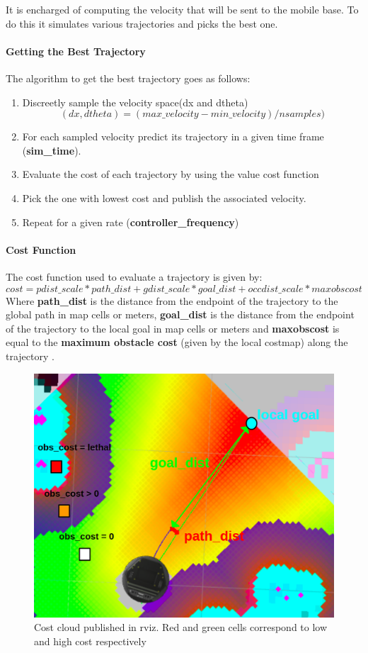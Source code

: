 \documentclass[12pt]{article}
\begin{document}
It is encharged of computing the velocity that will be sent to the mobile base. To do this it simulates various trajectories and picks the best one.

\paragraph{Getting the Best Trajectory}

The algorithm to get the best trajectory goes as follows:
\begin{enumerate}
    \item Discreetly sample the velocity space(dx and dtheta)
    \[(dx,dtheta)=(max\_velocity-min\_velocity)/nsamples)\]
    \item For each sampled velocity predict its trajectory in a given time frame (\textbf{sim\_time}).
    \item Evaluate the cost of each trajectory  by using the value cost function
    \item Pick the one with lowest cost and publish the associated velocity.
    \item Repeat for a given rate (\textbf{controller\_frequency})
\end{enumerate}


\paragraph{Cost Function}
The cost function used to evaluate a trajectory is given by:
\[
       cost = 
  pdist\_scale * path\_dist
  + gdist\_scale * goal\_dist
  + occdist\_scale * maxobscost 
\]
Where \textbf{path\_dist} is the distance from the endpoint of the trajectory to the global path in map cells or meters, \textbf{goal\_dist} is the distance from the endpoint of the trajectory to the local goal in map cells or meters and \textbf{maxobscost} is equal to the \textbf{maximum obstacle cost} (given by the local costmap) along the trajectory .
\begin{figure}[!htb]
    \centering
    \includegraphics[scale=0.3]{cost_cloud.png}
    \caption{Cost cloud published in rviz. Red and green cells correspond to low and high cost respectively}
    \label{fig:my_label}
\end{figure}
\end{document}
